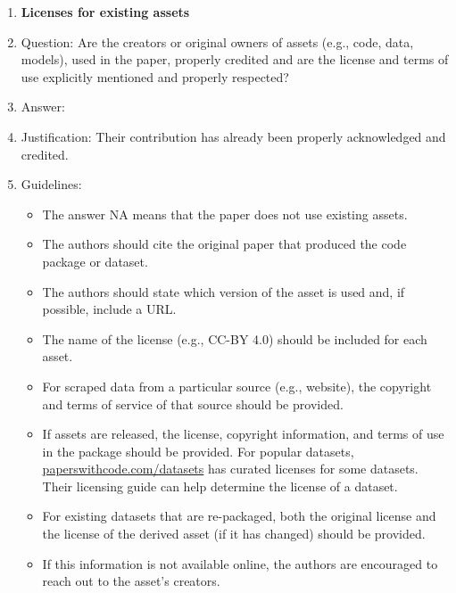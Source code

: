 \documentclass{article}
\begin{document}
\begin{enumerate}
\item {\bf Licenses for existing assets}
    \item[] Question: Are the creators or original owners of assets (e.g., code, data, models), used in the paper, properly credited and are the license and terms of use explicitly mentioned and properly respected?
    \item[] Answer: \answerYes{} %
    \item[] Justification: Their contribution has already been properly acknowledged and credited.
    \item[] Guidelines:
    \begin{itemize}
        \item The answer NA means that the paper does not use existing assets.
        \item The authors should cite the original paper that produced the code package or dataset.
        \item The authors should state which version of the asset is used and, if possible, include a URL.
        \item The name of the license (e.g., CC-BY 4.0) should be included for each asset.
        \item For scraped data from a particular source (e.g., website), the copyright and terms of service of that source should be provided.
        \item If assets are released, the license, copyright information, and terms of use in the package should be provided. For popular datasets, \url{paperswithcode.com/datasets} has curated licenses for some datasets. Their licensing guide can help determine the license of a dataset.
        \item For existing datasets that are re-packaged, both the original license and the license of the derived asset (if it has changed) should be provided.
        \item If this information is not available online, the authors are encouraged to reach out to the asset's creators.
    \end{itemize}


\end{enumerate}
\end{document}
